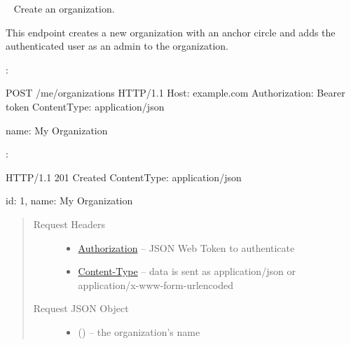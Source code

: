 \documentclass[letterpaper,10pt,english]{sphinxmanual}
\begin{document}
\begin{fulllineitems}
\label{\detokenize{resources/user:post--me-organizations}}~
Create an organization.

This endpoint creates a new organization with an anchor circle and
adds the authenticated user as an admin to the organization.

:

\begin{sphinxVerbatim}[commandchars=\\\{\}]
POST /me/organizations HTTP/1.1
Host: example.com
Authorization: Bearer \PYGZlt{}token\PYGZgt{}
Content\PYGZhy{}Type: application/json

\PYGZob{}
    \PYGZsq{}name\PYGZsq{}: \PYGZsq{}My Organization\PYGZsq{}
\PYGZcb{}
\end{sphinxVerbatim}

:

\begin{sphinxVerbatim}[commandchars=\\\{\}]
HTTP/1.1 201 Created
Content\PYGZhy{}Type: application/json

\PYGZob{}
    \PYGZsq{}id\PYGZsq{}: 1,
    \PYGZsq{}name\PYGZsq{}: \PYGZsq{}My Organization\PYGZsq{}
\PYGZcb{}
\end{sphinxVerbatim}
\begin{quote}\begin{description}
\item[{Request Headers}] \leavevmode\begin{itemize}
\item {} 
\href{http://tools.ietf.org/html/rfc7235\#section-4.2}{Authorization} -- JSON Web Token to authenticate

\item {} 
\href{http://tools.ietf.org/html/rfc7231\#section-3.1.1.5}{Content-Type} -- data is sent as application/json or
application/x-www-form-urlencoded

\end{itemize}

\item[{Request JSON Object}] \leavevmode\begin{itemize}
\item {} 
 () -- the organization's name

\end{itemize}


\end{description}
\end{quote}
\end{fulllineitems}
\end{document}
